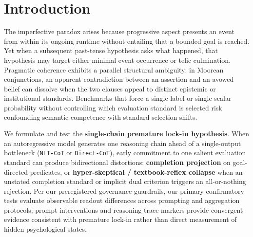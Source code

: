 \documentclass[11pt,a4paper]{article}
\begin{document}
\begin{abstract}
P16.7 extension comprises 4240 planned/collected units (4222 valid, 18 format-missing, 0 transport-missing) across five external models at 20 clusters per experiment, stage="dev", with less than 2\% missing in each completed slice; OpenAI gpt-4o-mini at top\_\allowbreak{}logprobs=20 has 1,000/1,000 valid units and zero missing. Single-chain readouts can conflate occurrence with completion, while multi-candidate protocols reverse some collapse; cross-model discrete NLI-CoT and scalar Direct-CoT judgments dissociate. Confirmatory effects concern observable prompt-and-readout protocols; internal premature lock-in remains a hypothesis. All code, stimuli, preregistered analysis plans, and verification tools are available at https://github.com/asj252/llm-judgment-studies.

\end{abstract}\vspace{0.5em}
\section{Introduction}

The imperfective paradox arises because progressive aspect presents an event from within its ongoing runtime without entailing that a bounded goal is reached. Yet when a subsequent past-tense hypothesis asks what happened, that hypothesis may target either minimal event occurrence or telic culmination. Pragmatic coherence exhibits a parallel structural ambiguity: in Moorean conjunctions, an apparent contradiction between an assertion and an avowed belief can dissolve when the two clauses appeal to distinct epistemic or institutional standards. Benchmarks that force a single label or single scalar probability without controlling which evaluation standard is selected risk confounding semantic competence with standard-selection shifts.

We formulate and test the \textbf{single-chain premature lock-in hypothesis}. When an autoregressive model generates one reasoning chain ahead of a single-output bottleneck (\texttt{NLI-\allowbreak{}CoT} or \texttt{Direct-\allowbreak{}CoT}), early commitment to one salient evaluation standard can produce bidirectional distortions: \textbf{completion projection} on goal-directed predicates, or \textbf{hyper-skeptical / textbook-reflex collapse} when an unstated completion standard or implicit dual criterion triggers an all-or-nothing rejection. Per our preregistered governance guardrails, our primary confirmatory tests evaluate observable readout differences across prompting and aggregation protocols; prompt interventions and reasoning-trace markers provide convergent evidence consistent with premature lock-in rather than direct measurement of hidden psychological states.
\end{document}
